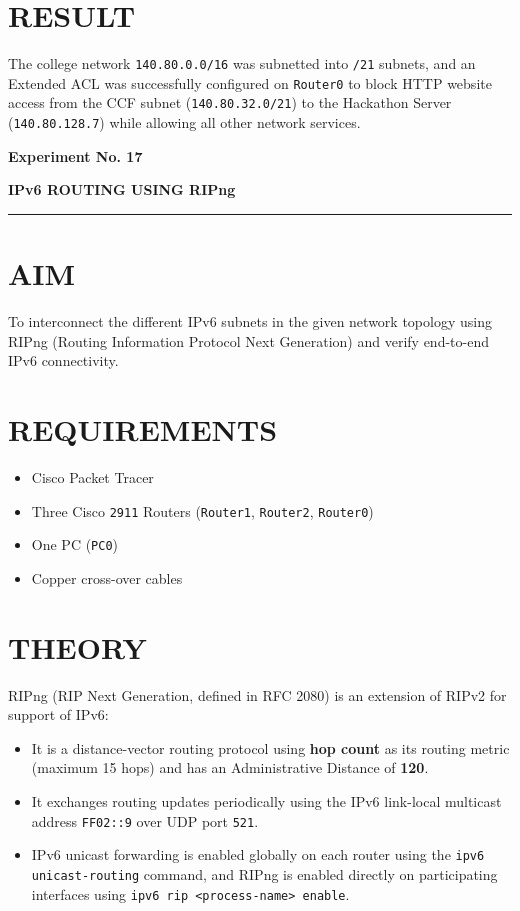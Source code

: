 \documentclass[12pt,a4paper]{article}
\newcommand{\experiment}[2]{
	\newpage
	
	\begin{center}
		\noindent
		\begin{minipage}{\textwidth}
			\centering
			{\textbf{\Large Experiment No. #1}}
			
			\vspace{1cm}
			
			\textbf{\Large #2}
		\end{minipage}
		
		\vspace{0.3cm}
		\noindent\rule{\textwidth}{0.6pt}
	\end{center}
}
\begin{document}
	\section*{RESULT}
	The college network \texttt{140.80.0.0/16} was subnetted into \texttt{/21} subnets, and an Extended ACL was successfully configured on \texttt{Router0} to block HTTP website access from the CCF subnet (\texttt{140.80.32.0/21}) to the Hackathon Server (\texttt{140.80.128.7}) while allowing all other network services.
	
	
	\iffalse
	\experiment{17}{IPv6 ROUTING USING RIPng}
	
	\section*{AIM}
	To interconnect the different IPv6 subnets in the given network topology using RIPng (Routing Information Protocol Next Generation) and verify end-to-end IPv6 connectivity.
	
	\section*{REQUIREMENTS}
	\begin{itemize}
		\item Cisco Packet Tracer
		\item Three Cisco \texttt{2911} Routers (\texttt{Router1}, \texttt{Router2}, \texttt{Router0})
		\item One PC (\texttt{PC0})
		\item Copper cross-over cables
	\end{itemize}
	
	\section*{THEORY}
	RIPng (RIP Next Generation, defined in RFC 2080) is an extension of RIPv2 for support of IPv6:
	\begin{itemize}
		\item It is a distance-vector routing protocol using \textbf{hop count} as its routing metric (maximum 15 hops) and has an Administrative Distance of \textbf{120}.
		\item It exchanges routing updates periodically using the IPv6 link-local multicast address \texttt{FF02::9} over UDP port \texttt{521}.
		\item IPv6 unicast forwarding is enabled globally on each router using the \texttt{ipv6 unicast-routing} command, and RIPng is enabled directly on participating interfaces using \texttt{ipv6 rip <process-name> enable}.
	\end{itemize}
	
\end{document}
